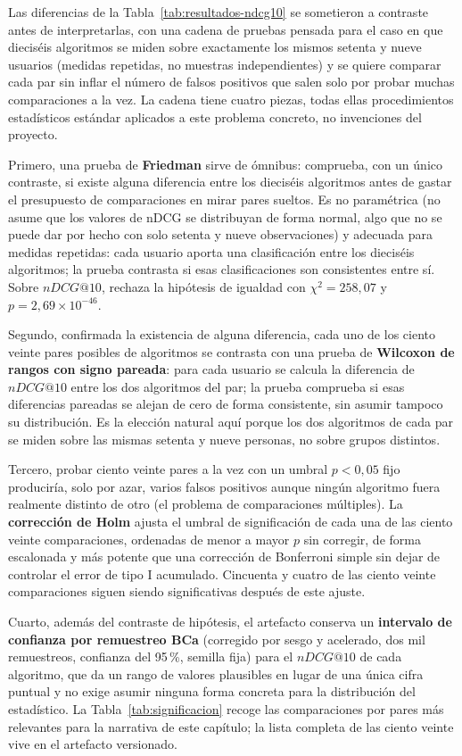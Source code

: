 Las diferencias de la Tabla~\ref{tab:resultados-ndcg10} se sometieron a contraste antes de
interpretarlas, con una cadena de pruebas pensada para el caso en que dieciséis algoritmos se
miden sobre exactamente los mismos setenta y nueve usuarios (medidas repetidas, no muestras
independientes) y se quiere comparar cada par sin inflar el número de falsos positivos que
salen solo por probar muchas comparaciones a la vez. La cadena tiene cuatro piezas, todas ellas
procedimientos estadísticos estándar aplicados a este problema concreto, no invenciones del
proyecto.

Primero, una prueba de \textbf{Friedman} sirve de ómnibus: comprueba, con un único contraste,
si existe alguna diferencia entre los dieciséis algoritmos antes de gastar el presupuesto de
comparaciones en mirar pares sueltos. Es no paramétrica (no asume que los valores de nDCG se
distribuyan de forma normal, algo que no se puede dar por hecho con solo setenta y nueve
observaciones) y adecuada para medidas repetidas: cada usuario aporta una clasificación entre los
dieciséis algoritmos; la prueba contrasta si esas clasificaciones son consistentes entre sí. Sobre
\(nDCG@10\), rechaza la hipótesis de igualdad con \(\chi^2=258{,}07\) y
\(p=2{,}69\times10^{-46}\).

Segundo, confirmada la existencia de alguna diferencia, cada uno de los ciento veinte pares
posibles de algoritmos se contrasta con una prueba de \textbf{Wilcoxon de rangos con signo
pareada}: para cada usuario se calcula la diferencia de \(nDCG@10\) entre los dos algoritmos
del par; la prueba comprueba si esas diferencias pareadas se alejan de cero de forma
consistente, sin asumir tampoco su distribución. Es la elección natural aquí porque los dos
algoritmos de cada par se miden sobre las mismas setenta y nueve personas, no sobre grupos
distintos.

Tercero, probar ciento veinte pares a la vez con un umbral \(p<0{,}05\) fijo produciría, solo
por azar, varios falsos positivos aunque ningún algoritmo fuera realmente distinto de otro
(el problema de comparaciones múltiples). La \textbf{corrección de Holm} ajusta el umbral de
significación de cada una de las ciento veinte comparaciones, ordenadas de menor a mayor \(p\)
sin corregir, de forma escalonada y más potente que una corrección de Bonferroni simple sin
dejar de controlar el error de tipo I acumulado. Cincuenta y cuatro de las ciento veinte
comparaciones siguen siendo significativas después de este ajuste.

Cuarto, además del contraste de hipótesis, el artefacto conserva un \textbf{intervalo de
confianza por remuestreo BCa} (corregido por sesgo y acelerado, dos mil
remuestreos, confianza del 95\,\%, semilla fija) para el \(nDCG@10\) de cada algoritmo, que da
un rango de valores plausibles en lugar de una única cifra puntual y no exige asumir ninguna
forma concreta para la distribución del estadístico. La Tabla~\ref{tab:significacion} recoge
las comparaciones por pares más relevantes para la narrativa de este capítulo; la lista
completa de las ciento veinte vive en el artefacto versionado.

